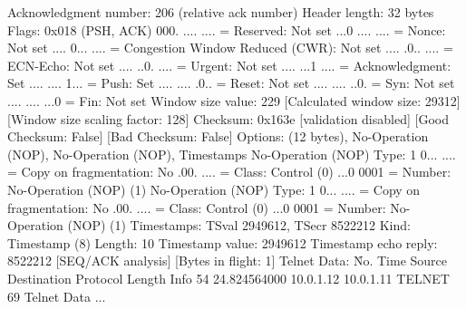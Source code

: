     Acknowledgment number: 206    (relative ack number)
    Header length: 32 bytes
    Flags: 0x018 (PSH, ACK)
        000. .... .... = Reserved: Not set
        ...0 .... .... = Nonce: Not set
        .... 0... .... = Congestion Window Reduced (CWR): Not set
        .... .0.. .... = ECN-Echo: Not set
        .... ..0. .... = Urgent: Not set
        .... ...1 .... = Acknowledgment: Set
        .... .... 1... = Push: Set
        .... .... .0.. = Reset: Not set
        .... .... ..0. = Syn: Not set
        .... .... ...0 = Fin: Not set
    Window size value: 229
    [Calculated window size: 29312]
    [Window size scaling factor: 128]
    Checksum: 0x163e [validation disabled]
        [Good Checksum: False]
        [Bad Checksum: False]
    Options: (12 bytes), No-Operation (NOP), No-Operation (NOP), Timestamps
        No-Operation (NOP)
            Type: 1
                0... .... = Copy on fragmentation: No
                .00. .... = Class: Control (0)
                ...0 0001 = Number: No-Operation (NOP) (1)
        No-Operation (NOP)
            Type: 1
                0... .... = Copy on fragmentation: No
                .00. .... = Class: Control (0)
                ...0 0001 = Number: No-Operation (NOP) (1)
        Timestamps: TSval 2949612, TSecr 8522212
            Kind: Timestamp (8)
            Length: 10
            Timestamp value: 2949612
            Timestamp echo reply: 8522212
    [SEQ/ACK analysis]
        [Bytes in flight: 1]
Telnet
    Data: \r

No.     Time           Source                Destination           Protocol Length Info
     54 24.824564000   10.0.1.12             10.0.1.11             TELNET   69     Telnet Data ...

